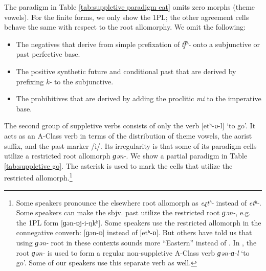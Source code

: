 The paradigm in Table \ref{tab:suppletive paradigm eat} omits zero morphs (theme vowels). For the finite forms, we only show the 1PL; the other agreement cells behave the same with respect to the root allomorphy. We omit the following:

\begin{itemize}
	\item The negatives that derive from simple prefixation of \textit{{t͡ʃʰ-}} onto a subjunctive or past perfective base. 
	\item The positive synthetic future and conditional past that are derived by prefixing \textit{{k-}} to the subjunctive. \item The prohibitives that are derived by adding the proclitic \textit{{mi}} to the imperative base.
\end{itemize}

The second group of suppletive verbs consists of only the verb [{{etʰ-ɒ-l}}] `to go'. It acts as an A-Class verb in terms of the distribution of theme vowels, the aorist suffix, and the past marker /{i}/. Its irregularity is that some of its paradigm cells utilize a restricted root allomorph \textit{{ɡən-}}. We show a partial paradigm in Table \ref{tab:suppletive go}. The asterisk is used to mark the cells that utilize the restricted allomorph.\footnote{Some speakers pronounce the elsewhere root allomorph as \textit{{eɻtʰ-}} instead of \textit{{etʰ-}}. Some speakers can make the sbjv. past    utilize the restricted root \textit{{ɡən-}}, e.g. the 1PL form [{{ɡən-ɒj-i-ŋkʰ}}]. Some speakers use the restricted allomorph in the connegative converb: [{{ɡən-ɒ}}] instead of [{{etʰ-ɒ}}]. But others have told us that using \textit{{ɡən-}} root in these contexts sounds more “Eastern” instead of {\iaIA}. In {\seaSEA}, the root \textit{{ɡən-}} is used to form a regular non-suppletive A-Class verb \textit{{ɡən-ɑ-l}} `to go'. Some of our speakers use this separate verb as well.}


